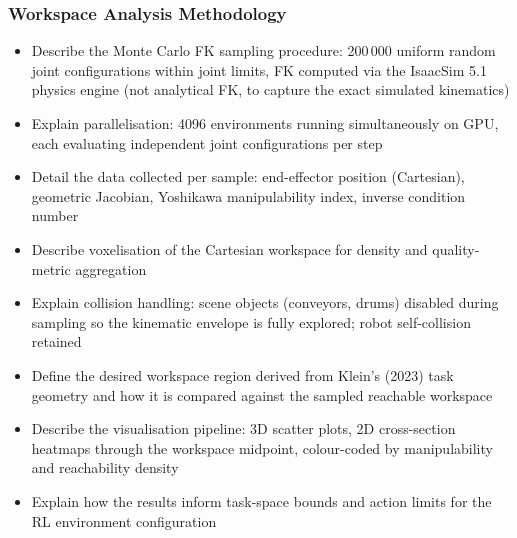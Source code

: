 \subsubsection{Workspace Analysis Methodology}
\begin{itemize}
    \item Describe the Monte Carlo FK sampling procedure: 200\,000 uniform random joint configurations within joint limits, FK computed via the IsaacSim 5.1 physics engine (not analytical FK, to capture the exact simulated kinematics)
    \item Explain parallelisation: 4096 environments running simultaneously on GPU, each evaluating independent joint configurations per step
    \item Detail the data collected per sample: end-effector position (Cartesian), geometric Jacobian, Yoshikawa manipulability index, inverse condition number
    \item Describe voxelisation of the Cartesian workspace for density and quality-metric aggregation
    \item Explain collision handling: scene objects (conveyors, drums) disabled during sampling so the kinematic envelope is fully explored; robot self-collision retained
    \item Define the desired workspace region derived from Klein's (2023) task geometry and how it is compared against the sampled reachable workspace
    \item Describe the visualisation pipeline: 3D scatter plots, 2D cross-section heatmaps through the workspace midpoint, colour-coded by manipulability and reachability density
    \item Explain how the results inform task-space bounds and action limits for the RL environment configuration
\end{itemize}

